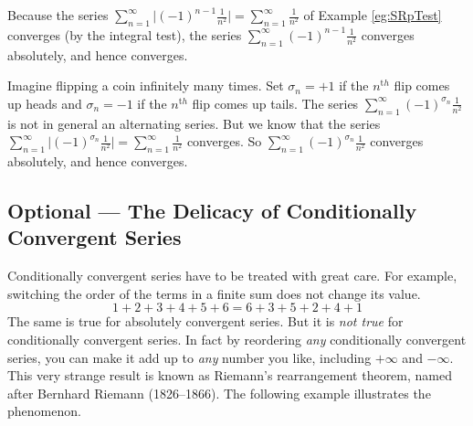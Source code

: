 \begin{eg}[$\sum_{n=1}^\infty(-1)^{n-1}\frac{1}{n^2}$]\label{eg:SRabsCondB}
Because the series $\sum_{n=1}^\infty\big|(-1)^{n-1}\frac{1}{n^2}\big|
=\sum\limits_{n=1}^\infty\frac{1}{n^2}$
of Example \ref{eg:SRpTest} converges (by the integral test),
the series $\sum\limits_{n=1}^\infty(-1)^{n-1}\frac{1}{n^2}$
converges absolutely, and hence converges.

\end{eg}

\begin{eg}\label{eg:SRabsCondC}
Imagine flipping a coin infinitely many times. Set $\sigma_n=+1$
if the $n^{\mathrm th}$ flip comes up heads and $\sigma_n=-1$
if the $n^{\mathrm th}$ flip comes up tails. The series
$\sum_{n=1}^\infty(-1)^{\sigma_n}\frac{1}{n^2}$ is not in general
an alternating series. But we know that the series $\sum_{n=1}^\infty\big|(-1)^{\sigma_n}\frac{1}{n^2}\big|
=\sum\limits_{n=1}^\infty\frac{1}{n^2}$
converges. So $\sum_{n=1}^\infty(-1)^{\sigma_n}\frac{1}{n^2}$
converges absolutely, and hence converges.
\end{eg}

\subsection{Optional --- The Delicacy of Conditionally Convergent Series}

Conditionally convergent series have to be treated with great care.
For example, switching the order of the terms in a finite
sum does not change its value.
\begin{equation*}
1+2+3+4+5+6 = 6+3+5+2+4+1
\end{equation*}
The same is true for absolutely convergent series. But it is \emph{not true}
for conditionally convergent series. In fact by reordering \emph{any}
conditionally convergent series, you can make it add up to \emph{any}
number you like, including $+\infty$ and $-\infty$. This very strange
result is known as Riemann's rearrangement theorem, named after
Bernhard Riemann (1826--1866). The following example illustrates the
phenomenon.

